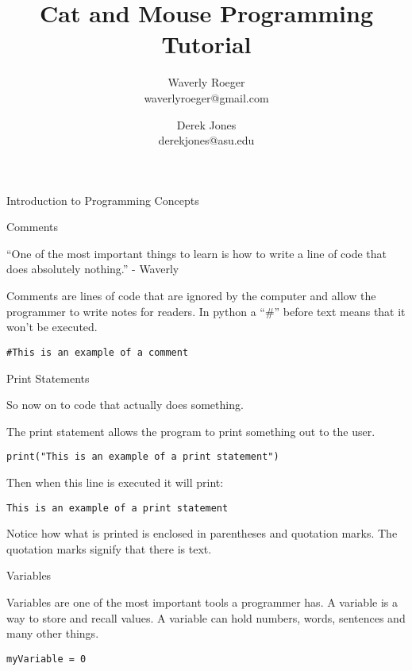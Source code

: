 \documentclass[12pt,oneside]{article}
\newcommand{\q}[1]{``#1''}
\newcommand{\subsectitle}[1]{
  \begin{flushleft}{\large#1}\end{flushleft}
}
\newcommand{\sectitlenonewpage}[1]{
  \begin{flushleft}{\huge#1}\end{flushleft}
}
\begin{document}
\title{Cat and Mouse Programming Tutorial}
\author{Waverly Roeger\\\normalsize waverlyroeger@gmail.com \and Derek Jones\\\normalsize derekjones@asu.edu}
\date{}

\maketitle

\sectitlenonewpage{Introduction to Programming Concepts}

\subsectitle{Comments}

\q{One of the most important things to learn is how to write a line of code that does absolutely nothing.} - Waverly

Comments are lines of code that are ignored by the computer and allow the programmer to write notes for readers. In python a \q{\#} before text means that it won't be executed.

\begin{lstlisting}
#This is an example of a comment
\end{lstlisting}

\subsectitle{Print Statements}

So now on to code that actually does something. 

The print statement allows the program to print something out to the user.

\begin{lstlisting}
print("This is an example of a print statement")
\end{lstlisting}

Then when this line is executed it will print:

\begin{lstlisting}
This is an example of a print statement
\end{lstlisting}

Notice how what is printed is enclosed in parentheses and quotation marks. The quotation marks signify that there is text. 

\subsectitle{Variables}

Variables are one of the most important tools a programmer has. A variable is a way to store and recall values. A variable can hold numbers, words, sentences and many other things. 


\begin{lstlisting}
myVariable = 0
\end{lstlisting}
\end{document}
